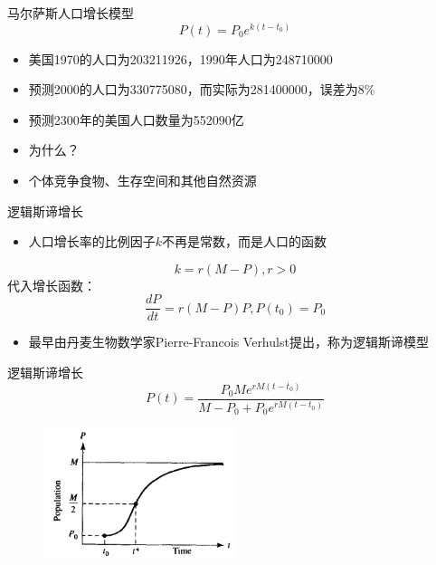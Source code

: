 \documentclass[mathserif, table]{beamer}
\begin{document}
\begin{frame}{马尔萨斯人口增长模型}
  \[
  P(t) = P_0e^{k(t-t_0)}
  \]
  
  \begin{itemize}
  \item 美国1970的人口为203211926，1990年人口为248710000
  \item 预测2000的人口为330775080，而实际为281400000，误差为8\%
  \item 预测2300年的美国人口数量为{\color{red}552090亿}
  \item 为什么？
  \item 个体竞争食物、生存空间和其他自然资源
  \end{itemize}
  
\end{frame}

\begin{frame}{逻辑斯谛增长}
  \begin{itemize}
  \item 人口增长率的比例因子$k$不再是常数，而是人口的函数
  \end{itemize}
  \[
  k = r(M-P), r>0
  \]
  代入增长函数：
  \[
  \frac{dP}{dt} = r(M-P)P, P(t_0) = P_0
  \]
  \begin{itemize}
  \item 最早由丹麦生物数学家Pierre-Francois Verhulst提出，称为逻辑斯谛模型
  \end{itemize}
  
\end{frame}

\begin{frame}{逻辑斯谛增长}
  \[
  P(t) = \frac{P_0Me^{rM(t-t_0)}}{M-P_0+P_0e^{rM(t-t_0)}}
  \]

  \begin{figure}
    \centering
    \includegraphics[width=0.5\textwidth]{logi.png}
  \end{figure}

\end{frame}
\end{document}
